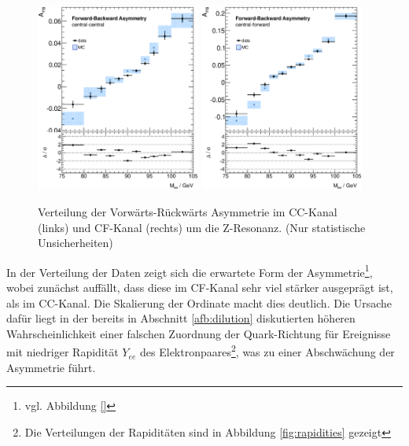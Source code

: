 \begin{figure}
    \centering
    \includegraphics[width=0.48\textwidth]{plots/afb_cc}
    \hfill
    \includegraphics[width=0.48\textwidth]{plots/afb_cf}
    \caption[Verteilung der Vorwärts-Rückwärts Asymmetrie im \ac{CC}-Kanal
        und \ac{CF}-Kanal]
        {Verteilung der Vorwärts-Rückwärts Asymmetrie im \ac{CC}-Kanal
        (links) und \ac{CF}-Kanal (rechts) um die Z-Resonanz. (Nur statistische
        Unsicherheiten)}
    \label{fig:afb_raw}
\end{figure}

In der Verteilung der Daten zeigt sich die erwartete Form der
Asymmetrie\footnote{vgl. Abbildung \ref{}}, wobei zunächst auffällt, dass diese
im \ac{CF}-Kanal sehr viel stärker ausgeprägt ist, als im \ac{CC}-Kanal. Die
Skalierung der Ordinate macht dies deutlich. Die Ursache dafür liegt in der
bereits in Abschnitt \ref{afb:dilution} diskutierten höheren Wahrscheinlichkeit
einer falschen Zuordnung der Quark-Richtung für Ereignisse mit niedriger
Rapidität $Y_{ee}$ des Elektronpaares\footnote{Die Verteilungen der Rapiditäten
sind in Abbildung \ref{fig:rapidities} gezeigt}, was zu einer Abschwächung der
Asymmetrie führt.

